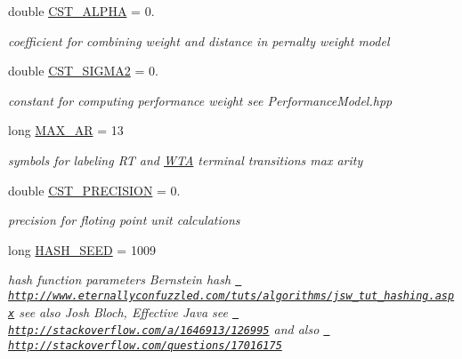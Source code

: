\begin{DoxyCompactItemize}
\mbox{\label{group__general_ga4f8704310ab1a776374c4103a70ee4ca}} 
double \mbox{\hyperlink{group__general_ga4f8704310ab1a776374c4103a70ee4ca}{C\+S\+T\+\_\+\+A\+L\+P\+HA}} = 0.
\begin{DoxyCompactList}\small\item\em coefficient for combining weight and distance in pernalty weight model \end{DoxyCompactList}\item 
\mbox{\label{group__general_gae30e96a43768e59d69b30739bca4b2a0}} 
double \mbox{\hyperlink{group__general_gae30e96a43768e59d69b30739bca4b2a0}{C\+S\+T\+\_\+\+S\+I\+G\+M\+A2}} = 0.
\begin{DoxyCompactList}\small\item\em constant for computing performance weight see Performance\+Model.\+hpp \end{DoxyCompactList}\item 
\mbox{\label{group__general_ga9ba08947d7e5ebba9df19496146a1bd4}} 
long \mbox{\hyperlink{group__general_ga9ba08947d7e5ebba9df19496146a1bd4}{M\+A\+X\+\_\+\+AR}} = 13
\begin{DoxyCompactList}\small\item\em symbols for labeling RT and \mbox{\hyperlink{classWTA}{W\+TA}} terminal transitions max arity \end{DoxyCompactList}\item 
\mbox{\label{group__general_gaa0818f0d579fa65f854f7540dab4d258}} 
double \mbox{\hyperlink{group__general_gaa0818f0d579fa65f854f7540dab4d258}{C\+S\+T\+\_\+\+P\+R\+E\+C\+I\+S\+I\+ON}} = 0.
\begin{DoxyCompactList}\small\item\em precision for floting point unit calculations \end{DoxyCompactList}\item 
long \mbox{\hyperlink{group__general_gae18ed995d696579fcc6018d8e9993e65}{H\+A\+S\+H\+\_\+\+S\+E\+ED}} = 1009
\begin{DoxyCompactList}\small\item\em hash function parameters Bernstein hash \href{http://www.eternallyconfuzzled.com/tuts/algorithms/jsw_tut_hashing.aspx}{\texttt{ http\+://www.\+eternallyconfuzzled.\+com/tuts/algorithms/jsw\+\_\+tut\+\_\+hashing.\+aspx}} see also Josh Bloch, Effective Java see \href{http://stackoverflow.com/a/1646913/126995}{\texttt{ http\+://stackoverflow.\+com/a/1646913/126995}} and also \href{http://stackoverflow.com/questions/17016175}{\texttt{ http\+://stackoverflow.\+com/questions/17016175}} \end{DoxyCompactList}\item 

\end{DoxyCompactItemize}
